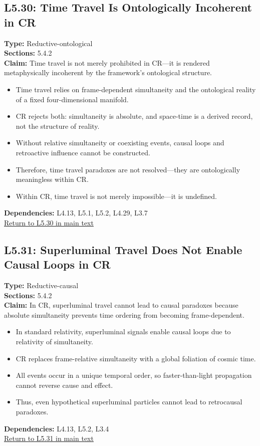\documentclass[12pt]{book}
\newcommand{\returnlink}[1]{\hyperref[logic:#1]{Return to #1 in main text}\xspace}
\begin{document}
\subsection*{L5.30: Time Travel Is Ontologically Incoherent in CR}
\label{appendix:L5.30}
\textbf{Type:} Reductive-ontological \\
\textbf{Sections:} 5.4.2 \\
\textbf{Claim:} Time travel is not merely prohibited in CR---it is rendered metaphysically incoherent by the framework's ontological structure.
\begin{itemize}
  \item Time travel relies on frame-dependent simultaneity and the ontological reality of a fixed four-dimensional manifold.
  \item CR rejects both: simultaneity is absolute, and space-time is a derived record, not the structure of reality.
  \item Without relative simultaneity or coexisting events, causal loops and retroactive influence cannot be constructed.
  \item Therefore, time travel paradoxes are not resolved---they are ontologically meaningless within CR.
  \item Within CR, time travel is not merely impossible---it is undefined.
\end{itemize}
\textbf{Dependencies:} L4.13, L5.1, L5.2, L4.29, L3.7 \\
\returnlink{L5.30}

\subsection*{L5.31: Superluminal Travel Does Not Enable Causal Loops in CR}
\label{appendix:L5.31}
\textbf{Type:} Reductive-causal \\
\textbf{Sections:} 5.4.2 \\
\textbf{Claim:} In CR, superluminal travel cannot lead to causal paradoxes because absolute simultaneity prevents time ordering from becoming frame-dependent.
\begin{itemize}
  \item In standard relativity, superluminal signals enable causal loops due to relativity of simultaneity.
  \item CR replaces frame-relative simultaneity with a global foliation of cosmic time.
  \item All events occur in a unique temporal order, so faster-than-light propagation cannot reverse cause and effect.
  \item Thus, even hypothetical superluminal particles cannot lead to retrocausal paradoxes.
\end{itemize}
\textbf{Dependencies:} L4.13, L5.2, L3.4 \\
\returnlink{L5.31}
\end{document}
